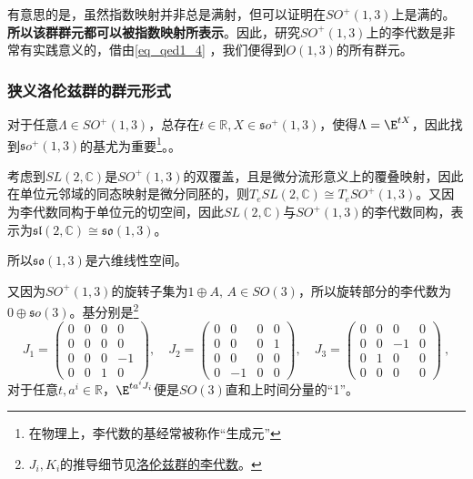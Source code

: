 有意思的是，虽然指数映射并非总是满射，但可以证明在$SO^+(1,3)$上是满的。
\textbf{所以该群群元都可以被指数映射所表示}。因此，研究$SO^+(1,3)$上的李代数是非常有实践意义的，借由\autoref{eq_qed1_4} ，我们便得到$O(1,3)$的所有群元。

\subsubsection{狭义洛伦兹群的群元形式}
对于任意$\Lambda\in SO^+(1,3)$，总存在$t\in \mathbb R,X\in \mathfrak so^+(1,3)$，使得$\Lambda=\E^{tX}$，因此找到$\mathfrak so^+(1,3)$的基尤为重要\footnote{在物理上，李代数的基经常被称作“生成元”}。。

考虑到$SL(2,\mathbb C)$是$SO^+(1,3)$的双覆盖，且是微分流形意义上的覆叠映射，因此在单位元邻域的同态映射是微分同胚的，则$T_e SL(2,\mathbb C)\cong T_e{SO}^+(1,3)$。又因为李代数同构于单位元的切空间，因此$SL(2,\mathbb C)$与$SO^+(1,3)$的李代数同构，表示为$\mathfrak {sl}(2,\mathbb C)\cong \mathfrak{so}(1,3)$。

所以$\mathfrak{so}(1,3)$是六维线性空间。


又因为$SO^+(1,3)$的旋转子集为$1\oplus A,\,A\in SO(3)$，所以旋转部分的李代数为$0\oplus \mathfrak so(3)$。基分别是\footnote{$J_i,K_i$的推导细节见\href{https://wuli.wiki/online/lielot.html}{洛伦兹群的李代数}。}
\begin{equation}
J_{1}=\begin{pmatrix}0&0&0&0\\0&0&0&0\\0&0&0&-1\\0&0&1&0\end{pmatrix},\quad J_{2}=\begin{pmatrix}0&0&0&0\\0&0&0&1\\0&0&0&0\\0&-1&0&0\end{pmatrix},\quad J_{3}=\begin{pmatrix}0&0&0&0\\0&0&-1&0\\0&1&0&0\\0&0&0&0\end{pmatrix}~,
\end{equation}
对于任意$t,a^i\in\mathbb R$，$\E^{ta^iJ_i}$便是$SO(3)$直和上时间分量的“1”。

